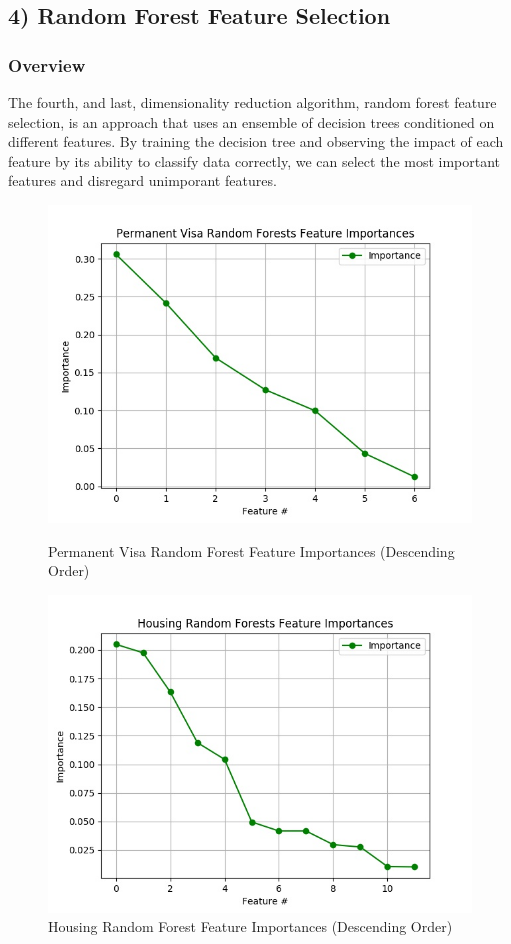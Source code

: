 \documentclass[h]{article}
\begin{document}
\subsection*{4) Random Forest Feature Selection}  
\subsubsection*{Overview}
The fourth, and last, dimensionality reduction algorithm, random forest feature selection, is an 
approach that uses an ensemble of decision trees conditioned on different 
features.  By training the decision tree and observing the impact of each 
feature by its ability to classify data correctly, we can select the most 
important features and disregard unimporant features.

 \begin{figure}[H]
      \includegraphics[width=1\textwidth,keepaspectratio]{permanent_visa_random_forests_feature_importances.jpg} 
      \caption*{Permanent Visa Random Forest Feature Importances (Descending Order) } 
   \endminipage\hfill
      \includegraphics[width=1\textwidth,keepaspectratio]{housing_random_forests_feature_importances.jpg} 
      \caption*{Housing Random Forest Feature Importances (Descending Order)} 
   \endminipage\hfill
\end{figure}
\end{document}
